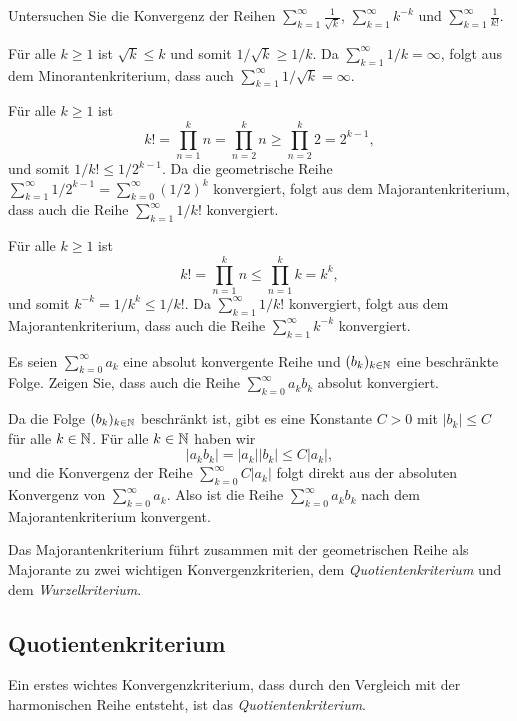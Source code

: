 \documentclass[a4paper,10pt]{article}
\begin{document}
\begin{question}
 Untersuchen Sie die Konvergenz der Reihen $\sum_{k=1}^\infty \frac{1}{\sqrt{k}}$, $\sum_{k=1}^\infty k^{-k}$ und $\sum_{k=1}^\infty \frac{1}{k!}$.
\end{question}
\begin{solution}
 Für alle $k \geq 1$ ist $\sqrt{k} \leq k$ und somit $1/\sqrt{k} \geq 1/k$. Da $\sum_{k=1}^\infty 1/k = \infty$, folgt aus dem Minorantenkriterium, dass auch $\sum_{k=1}^\infty 1/\sqrt{k} = \infty$.
 
 Für alle $k \geq 1$ ist
 \[
  k!
  = \prod_{n=1}^k n
  = \prod_{n=2}^k n
  \geq \prod_{n=2}^k 2
  = 2^{k-1},
 \]
 und somit $1/k! \leq 1/2^{k-1}$. Da die geometrische Reihe $\sum_{k=1}^\infty 1/2^{k-1} = \sum_{k=0}^\infty (1/2)^k$ konvergiert, folgt aus dem Majorantenkriterium, dass auch die Reihe $\sum_{k=1}^\infty 1/k!$ konvergiert.
 
 Für alle $k \geq 1$ ist
 \[
  k! = \prod_{n=1}^k n \leq \prod_{n=1}^k k = k^k,
 \]
 und somit $k^{-k} = 1/k^k \leq 1/k!$. Da $\sum_{k=1}^\infty 1/k!$ konvergiert, folgt aus dem Majorantenkriterium, dass auch die Reihe $\sum_{k=1}^\infty k^{-k}$ konvergiert.
\end{solution}

\begin{question}\label{qst: absolut konvergent und beschränkt}
 Es seien $\sum_{k=0}^\infty a_k$ eine absolut konvergente Reihe und $(b_k)_{k \in \mathbb{N}}$ eine beschränkte Folge. Zeigen  Sie, dass auch die Reihe $\sum_{k=0}^\infty a_k b_k$ absolut konvergiert.
\end{question}
\begin{solution}
 Da die Folge $(b_k)_{k \in \mathbb{N}}$ beschränkt ist, gibt es eine Konstante $C > 0$ mit $|b_k| \leq C$ für alle $k \in \mathbb{N}$. Für alle $k \in \mathbb{N}$ haben wir
 \[
  |a_k b_k|
  = |a_k| |b_k|
  \leq C |a_k|,
 \]
 und die Konvergenz der Reihe $\sum_{k=0}^\infty C |a_k|$ folgt direkt aus der absoluten Konvergenz von $\sum_{k=0}^\infty a_k$. Also ist die Reihe $\sum_{k=0}^\infty a_k b_k$ nach dem Majorantenkriterium konvergent.
\end{solution}


Das Majorantenkriterium führt zusammen mit der geometrischen Reihe als Majorante zu zwei wichtigen Konvergenzkriterien, dem \emph{Quotientenkriterium} und dem \emph{Wurzelkriterium}.





\subsection{Quotientenkriterium}
Ein erstes wichtes Konvergenzkriterium, dass durch den Vergleich mit der harmonischen Reihe entsteht, ist das \emph{Quotientenkriterium}.
\end{document}
